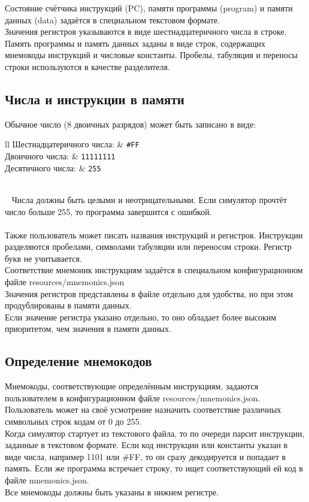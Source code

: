Состояние счётчика инструкций (PC), памяти программы (program) и памяти данных (data) задаётся в специальном текстовом формате. \\
Значения регистров указываются в виде шестнадцатеричного числа в строке. \\
Память программы и память данных заданы в виде строк, содержащих мнемокоды инструкций и числовые константы. Пробелы, табуляция и переносы строки используются в качестве разделителя.

\subsection{Числа и инструкции в памяти}
Обычное число (8 двоичных разрядов) может быть записано в виде:
~
~\\[3mm]
\begin{tabular}{{l}{l}}
	Шестнадцатеричного числа: & {\tt\large \#FF} \\[2mm]
	Двоичного числа:          & {\tt\large 11111111} \\[2mm]
	Десятичного числа:        & {\tt\large *255} \\
\end{tabular} \\[3mm]
~
Числа должны быть целыми и неотрицательными. Если симулятор прочтёт число больше 255, то программа завершится с ошибкой.\\
~\\
Также пользователь может писать названия инструкций и регистров. Инструкции разделяются пробелами, символами табуляции или переносом строки. Регистр букв не учитывается.\\
Соответствие мнемоник инструкциям задаётся в специальном конфигурационном файле resources/mnemonics.json \\
Значения регистров представлены в файле отдельно для удобства, но при этом продублированы в памяти данных. \\
Если значение регистра указано отдельно, то оно обладает более высоким приоритетом, чем значения в памяти данных.

\subsection{Определение мнемокодов}
Мнемокоды, соответствующие определённым инструкциям, задаются пользователем в конфигурационном файле resources/mnemonics.json. \\
Пользователь может на своё усмотрение назначить соответствие различных символьных строк кодам от 0 до 255. \\
Когда симулятор стартует из текстового файла, то по очереди парсит инструкции, заданные в текстовом формате. Если код инструкции или константы указан в виде числа, например 1101 или \#FF, то он сразу декодируется и попадает в память. Если же программа встречает строку, то ищет соответствующий ей код в файле mnemonics.json. \\
Все мнемокоды должны быть указаны в нижнем регистре.
